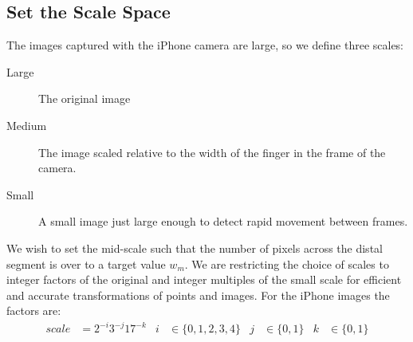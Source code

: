 \subsection{Set the Scale Space}\label{sec:SetTheScaleSpace}
The images captured with the iPhone camera are large, so we define three scales: 
\begin{description}
\item[Large] The original image
\item[Medium] The image scaled relative to the width of the finger in the frame of the camera.
\item[Small] A small image just large enough to detect rapid movement between frames.
\end{description}


We wish to set the mid-scale such that the number of pixels across the distal segment is over to a target value $w_m$. We are restricting the choice of scales to integer factors of the original and integer multiples of the small scale for efficient and accurate transformations of points and images. For the iPhone images the factors are:
\begin{align}
scale &= 2^{-i} 3^{-j} 17^{-k}  & i &\in \{0,1,2,3,4\} 
&  j &\in \{0, 1\} 
& k &\in \{0, 1\}
\end{align}

